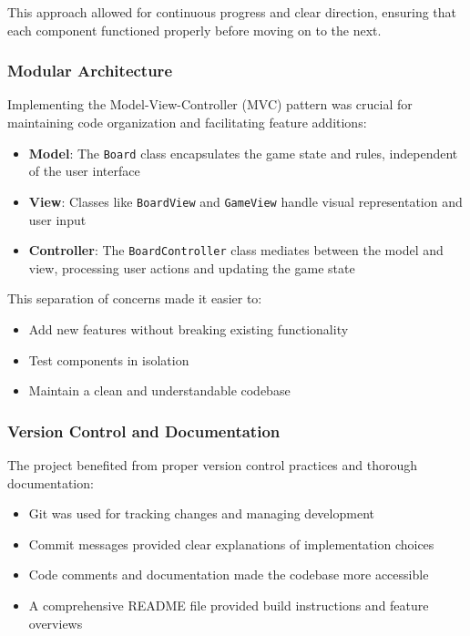 This approach allowed for continuous progress and clear direction, ensuring that each component functioned properly before moving on to the next.

\subsubsection{Modular Architecture}
Implementing the Model-View-Controller (MVC) pattern was crucial for maintaining code organization and facilitating feature additions:

\begin{itemize}
    \item \textbf{Model}: The \texttt{Board} class encapsulates the game state and rules, independent of the user interface
    \item \textbf{View}: Classes like \texttt{BoardView} and \texttt{GameView} handle visual representation and user input
    \item \textbf{Controller}: The \texttt{BoardController} class mediates between the model and view, processing user actions and updating the game state
\end{itemize}

This separation of concerns made it easier to:
\begin{itemize}
    \item Add new features without breaking existing functionality
    \item Test components in isolation
    \item Maintain a clean and understandable codebase
\end{itemize}

\subsubsection{Version Control and Documentation}
The project benefited from proper version control practices and thorough documentation:

\begin{itemize}
    \item Git was used for tracking changes and managing development
    \item Commit messages provided clear explanations of implementation choices
    \item Code comments and documentation made the codebase more accessible
    \item A comprehensive README file provided build instructions and feature overviews
\end{itemize}

